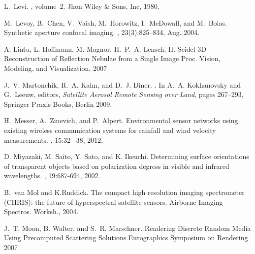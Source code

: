 \documentclass[10pt,twocolumn,letterpaper]{article}
\begin{document}
{\begin{thebibliography}{10}
   L.~Levi.  ,
    volume~2.  \newblock Jhon Wiley \& Sons, Inc, 1980.

   M.~Levoy, B.~Chen, V.~Vaish, M.~Horowitz,
    I.~McDowall, and M.~Bolas.  \newblock Synthetic aperture confocal
    imaging.  , 23(3):825--834, Aug. 2004.


   A. Lintu, L. Hoffmann, M. Magnor, H.~P.~A. Lensch,
    H. Seidel \newblock 3D Reconstruction of Reflection Nebulae from a
    Single Image \newblock Proc. Vision, Modeling, and Visualization,
    2007

   J.~V. Martonchik, R.~A. Kahn, and
    D.~J. Diner.  .  \newblock In A.~A. Kokhanovsky and
    G.~Leeuw, editors, {\em Satellite Aerosol Remote Sensing over
      Land}, pages 267--293, Springer Praxis Books, Berlin 2009.

   H.~Messer, A.~Zinevich, and P.~Alpert.  \newblock
    Environmental sensor networks using existing wireless
    communication systems for rainfall and wind velocity measurements.
    , 15:32 --38,
    2012.

   D. Miyazaki, M. Saito, Y. Sato, and K. Ikeuchi.
    \newblock Determining surface orientations of transparent objects
    based on polarization degress in visible and infrared wavelengths.
    , 19:687-694, 2002.

   B.~van Mol and K.Ruddick.  \newblock The compact
    high resolution imaging spectrometer (CHRIS): the future of
    hyperspectral satellite sensors.  \newblock Airborne Imaging
    Spectros. Worksh., 2004.

   J.~T. Moon, B. Walter, and S.~R. Marschner.
    \newblock Rendering Discrete Random Media Using Precomputed
    Scattering Solutions \newblock Eurographics Symposium on Rendering
    2007



\end{thebibliography}}
\end{document}
